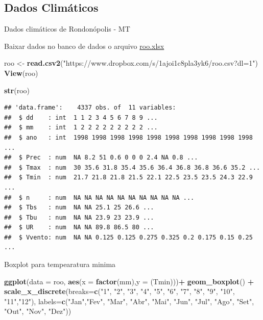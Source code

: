\documentclass[]{book}
\newenvironment{Shaded}{\begin{snugshade}}{\end{snugshade}}
\newcommand{\DataTypeTok}[1]{\textcolor[rgb]{0.13,0.29,0.53}{#1}}
\newcommand{\KeywordTok}[1]{\textcolor[rgb]{0.13,0.29,0.53}{\textbf{#1}}}
\newcommand{\NormalTok}[1]{#1}
\newcommand{\OperatorTok}[1]{\textcolor[rgb]{0.81,0.36,0.00}{\textbf{#1}}}
\newcommand{\StringTok}[1]{\textcolor[rgb]{0.31,0.60,0.02}{#1}}
\begin{document}
\hypertarget{dados-climaticos}{%
\subsection{Dados Climáticos}\label{dados-climaticos}}

Dados climáticos de Rondonópolis - MT

Baixar dados no banco de dados o arquivo \href{https://www.dropbox.com/s/1ajoi1c8pla3yk6/roo.csv?dl=1}{roo.xlsx}

\begin{Shaded}
\begin{Highlighting}[]
\NormalTok{roo <-}\StringTok{ }\KeywordTok{read.csv2}\NormalTok{(}\StringTok{"https://www.dropbox.com/s/1ajoi1c8pla3yk6/roo.csv?dl=1"}\NormalTok{)}
\KeywordTok{View}\NormalTok{(roo)}

\KeywordTok{str}\NormalTok{(roo)}
\end{Highlighting}
\end{Shaded}

\begin{verbatim}
## 'data.frame':    4337 obs. of  11 variables:
##  $ dd    : int  1 1 2 3 4 5 6 7 8 9 ...
##  $ mm    : int  1 2 2 2 2 2 2 2 2 2 ...
##  $ ano   : int  1998 1998 1998 1998 1998 1998 1998 1998 1998 1998 ...
##  $ Prec  : num  NA 8.2 51 0.6 0 0 0 2.4 NA 0.8 ...
##  $ Tmax  : num  30 35.6 31.8 35.4 35.6 36.4 36.8 36.8 36.6 35.2 ...
##  $ Tmin  : num  21.7 21.8 21.8 21.5 22.1 22.5 23.5 23.5 24.3 22.9 ...
##  $ n     : num  NA NA NA NA NA NA NA NA NA NA ...
##  $ Tbs   : num  NA NA 25.1 25 26.6 ...
##  $ Tbu   : num  NA NA 23.9 23 23.9 ...
##  $ UR    : num  NA NA 89.8 86.5 80 ...
##  $ Vvento: num  NA NA 0.125 0.125 0.275 0.325 0.2 0.175 0.15 0.25 ...
\end{verbatim}

Boxplot para tempearatura minima

\begin{Shaded}
\begin{Highlighting}[]
\KeywordTok{ggplot}\NormalTok{(}\DataTypeTok{data =}\NormalTok{ roo, }\KeywordTok{aes}\NormalTok{(}\DataTypeTok{x =} \KeywordTok{factor}\NormalTok{(mm),}\DataTypeTok{y =}\NormalTok{ (Tmin)))}\OperatorTok{+}
\StringTok{  }\KeywordTok{geom_boxplot}\NormalTok{() }\OperatorTok{+}
\StringTok{  }\KeywordTok{scale_x_discrete}\NormalTok{(}\DataTypeTok{breaks=}\KeywordTok{c}\NormalTok{(}\StringTok{"1"}\NormalTok{, }\StringTok{"2"}\NormalTok{, }\StringTok{"3"}\NormalTok{, }\StringTok{"4"}\NormalTok{, }\StringTok{"5"}\NormalTok{, }\StringTok{"6"}\NormalTok{, }\StringTok{"7"}\NormalTok{, }\StringTok{"8"}\NormalTok{, }\StringTok{"9"}\NormalTok{, }\StringTok{"10"}\NormalTok{, }\StringTok{"11"}\NormalTok{,}\StringTok{"12"}\NormalTok{),}
            \DataTypeTok{labels=}\KeywordTok{c}\NormalTok{(}\StringTok{"Jan"}\NormalTok{,}\StringTok{"Fev"}\NormalTok{, }\StringTok{"Mar"}\NormalTok{, }\StringTok{"Abr"}\NormalTok{, }\StringTok{"Mai"}\NormalTok{, }\StringTok{"Jun"}\NormalTok{, }\StringTok{"Jul"}\NormalTok{, }\StringTok{"Ago"}\NormalTok{, }\StringTok{"Set"}\NormalTok{, }\StringTok{"Out"}\NormalTok{, }\StringTok{"Nov"}\NormalTok{, }\StringTok{"Dez"}\NormalTok{))}
\end{Highlighting}
\end{Shaded}
\end{document}
